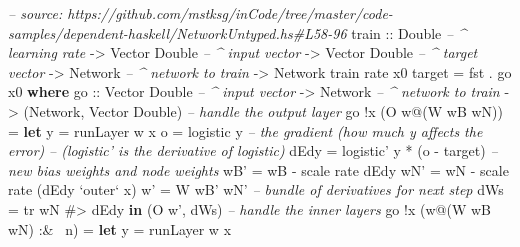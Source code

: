 \documentclass[]{article}
\newenvironment{Shaded}{}{}
\newcommand{\KeywordTok}[1]{\textcolor[rgb]{0.00,0.44,0.13}{\textbf{{#1}}}}
\newcommand{\DataTypeTok}[1]{\textcolor[rgb]{0.56,0.13,0.00}{{#1}}}
\newcommand{\CommentTok}[1]{\textcolor[rgb]{0.38,0.63,0.69}{\textit{{#1}}}}
\newcommand{\OtherTok}[1]{\textcolor[rgb]{0.00,0.44,0.13}{{#1}}}
\newcommand{\FunctionTok}[1]{\textcolor[rgb]{0.02,0.16,0.49}{{#1}}}
\newcommand{\NormalTok}[1]{{#1}}
\begin{document}
\begin{Shaded}
\begin{Highlighting}[]
\CommentTok{-- source: https://github.com/mstksg/inCode/tree/master/code-samples/dependent-haskell/NetworkUntyped.hs#L58-96}
\OtherTok{train ::} \DataTypeTok{Double}           \CommentTok{-- ^ learning rate}
      \OtherTok{->} \DataTypeTok{Vector} \DataTypeTok{Double}    \CommentTok{-- ^ input vector}
      \OtherTok{->} \DataTypeTok{Vector} \DataTypeTok{Double}    \CommentTok{-- ^ target vector}
      \OtherTok{->} \DataTypeTok{Network}          \CommentTok{-- ^ network to train}
      \OtherTok{->} \DataTypeTok{Network}
\NormalTok{train rate x0 target }\FunctionTok{=} \NormalTok{fst }\FunctionTok{.} \NormalTok{go x0}
  \KeywordTok{where}
\OtherTok{    go ::} \DataTypeTok{Vector} \DataTypeTok{Double}    \CommentTok{-- ^ input vector}
       \OtherTok{->} \DataTypeTok{Network}          \CommentTok{-- ^ network to train}
       \OtherTok{->} \NormalTok{(}\DataTypeTok{Network}\NormalTok{, }\DataTypeTok{Vector} \DataTypeTok{Double}\NormalTok{)}
    \CommentTok{-- handle the output layer}
    \NormalTok{go }\FunctionTok{!}\NormalTok{x (}\DataTypeTok{O} \NormalTok{w}\FunctionTok{@}\NormalTok{(}\DataTypeTok{W} \NormalTok{wB wN))}
        \FunctionTok{=} \KeywordTok{let} \NormalTok{y    }\FunctionTok{=} \NormalTok{runLayer w x}
              \NormalTok{o    }\FunctionTok{=} \NormalTok{logistic y}
              \CommentTok{-- the gradient (how much y affects the error)}
              \CommentTok{--   (logistic' is the derivative of logistic)}
              \NormalTok{dEdy }\FunctionTok{=} \NormalTok{logistic' y }\FunctionTok{*} \NormalTok{(o }\FunctionTok{-} \NormalTok{target)}
              \CommentTok{-- new bias weights and node weights}
              \NormalTok{wB'  }\FunctionTok{=} \NormalTok{wB }\FunctionTok{-} \NormalTok{scale rate dEdy}
              \NormalTok{wN'  }\FunctionTok{=} \NormalTok{wN }\FunctionTok{-} \NormalTok{scale rate (dEdy }\OtherTok{`outer`} \NormalTok{x)}
              \NormalTok{w'   }\FunctionTok{=} \DataTypeTok{W} \NormalTok{wB' wN'}
              \CommentTok{-- bundle of derivatives for next step}
              \NormalTok{dWs  }\FunctionTok{=} \NormalTok{tr wN }\FunctionTok{#>} \NormalTok{dEdy}
          \KeywordTok{in}  \NormalTok{(}\DataTypeTok{O} \NormalTok{w', dWs)}
    \CommentTok{-- handle the inner layers}
    \NormalTok{go }\FunctionTok{!}\NormalTok{x (w}\FunctionTok{@}\NormalTok{(}\DataTypeTok{W} \NormalTok{wB wN) }\FunctionTok{:&~} \NormalTok{n)}
        \FunctionTok{=} \KeywordTok{let} \NormalTok{y          }\FunctionTok{=} \NormalTok{runLayer w x}

\end{Highlighting}
\end{Shaded}
\end{document}
